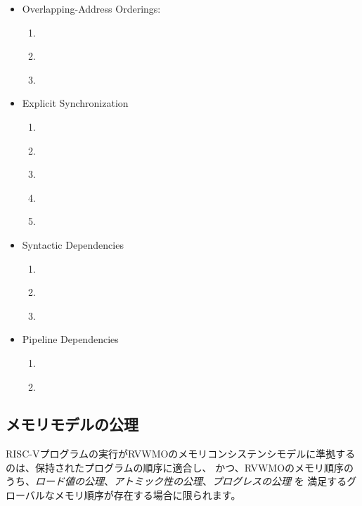 \begin{itemize}
  \item Overlapping-Address Orderings:
    \begin{enumerate}
      \item\label{ppo:->st} \ppost
      \item\label{ppo:rdw} \ppordw
      \item\label{ppo:amoforward} \ppoamoforward
    \end{enumerate}
  \item Explicit Synchronization
    \begin{enumerate}[resume]
      \item\label{ppo:fence} \ppofence
      \item\label{ppo:acquire} \ppoacquire
      \item\label{ppo:release} \pporelease
      \item\label{ppo:rcsc} \pporcsc
      \item\label{ppo:pair} \ppopair
    \end{enumerate}
  \item Syntactic Dependencies
    \begin{enumerate}[resume]
      \item\label{ppo:addr} \ppoaddr
      \item\label{ppo:data} \ppodata
      \item\label{ppo:ctrl} \ppoctrl
    \end{enumerate}
  \item Pipeline Dependencies
    \begin{enumerate}[resume]
      \item\label{ppo:addrdatarfi} \ppoaddrdatarfi
      \item\label{ppo:addrpo} \ppoaddrpo
    \end{enumerate}
\end{itemize}

\begin{comment}
\subsection*{Memory Model Axioms}
\end{comment}
\subsection*{メモリモデルの公理}
\begin{comment}
An execution of a RISC-V program obeys the RVWMO memory consistency model only if there exists a global memory order conforming to preserved program order and satisfying the {\em load value axiom}, the {\em atomicity axiom}, and the {\em progress axiom}.
\end{comment}
RISC-Vプログラムの実行がRVWMOのメモリコンシステンシモデルに準拠するのは、保持されたプログラムの順序に適合し、
かつ、RVWMOのメモリ順序のうち、{\em ロード値の公理}、{\em アトミック性の公理}、{\em プログレスの公理} を
満足するグローバルなメモリ順序が存在する場合に限られます。

